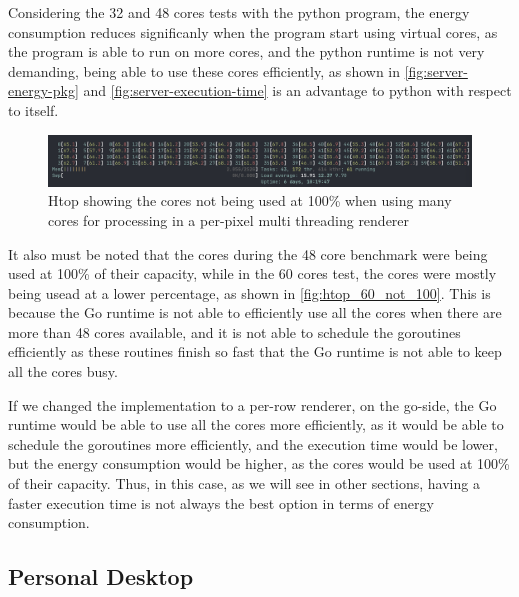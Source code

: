 Considering the 32 and 48 cores tests with the python program, the energy consumption reduces significanly when the program start using virtual cores, as the program is able to run on more cores, and the python runtime is not very demanding, being able to use these cores efficiently, as shown in \autoref{fig:server-energy-pkg} and \autoref{fig:server-execution-time} is an advantage to python with respect to itself.



\begin{figure}
    \centering
    \includegraphics[width=1\linewidth]{img/htop_not_running_100_60_cores.png}
    \caption{Htop showing the cores not being used at 100\% when using many cores for processing in a per-pixel multi threading renderer }
    \label{fig:htop_60_not_100}
\end{figure}

It also must be noted that the cores during the 48 core benchmark were being used at 100\% of their capacity, while in the 60 cores test, the cores were mostly being usead at a lower percentage, as shown in \autoref{fig:htop_60_not_100}. This is because the Go runtime is not able to efficiently use all the cores when there are more than 48 cores available, and it is not able to schedule the goroutines efficiently as these routines finish so fast that the Go runtime is not able to keep all the cores busy.

If we changed the implementation to a per-row renderer, on the go-side, the Go runtime would be able to use all the cores more efficiently, as it would be able to schedule the goroutines more efficiently, and the execution time would be lower, but the energy consumption would be higher, as the cores would be used at 100\% of their capacity. Thus, in this case, as we will see in other sections, having a faster execution time is not always the best option in terms of energy consumption.







\subsection{Personal Desktop}
